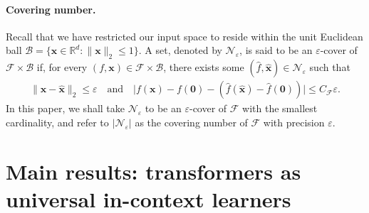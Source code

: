 \documentclass[english]{article}
\begin{document}



\paragraph{Covering number.} 
%
Recall that we have restricted our input space to reside within the unit Euclidean ball $\mathcal{B} = \{{\bm x}\in\mathbb{R}^d:\|{\bm x}\|_2\le 1\}$. 
A set, denoted by $\mathcal{N}_{\varepsilon}$, is said to be an $\varepsilon$-cover of $\mathcal{F}\times \mathcal{B}$ if, for every $(f, {\bm x}) \in \mathcal{F}\times \mathcal{B}$, 
there exists some $(\widehat{f}, \widehat{{\bm x}}) \in \mathcal{N}_{\varepsilon}$ such that
%
\begin{align}
\|{\bm x} - \widehat{{\bm x}}\|_2 \le \varepsilon
\quad\text{and}\quad
\big|f({\bm x}) - f({\bm 0}) - (\widehat{f}(\widehat{{\bm x}}) - \widehat{f}({\bm 0}))\big| \le C_{\mathcal{F}}\varepsilon.
\label{eq:defn-eps-cover}
\end{align}
%
In this paper, we shall take $\mathcal{N}_{\varepsilon}$ to be an $\varepsilon$-cover of $\mathcal{F}$ with the smallest cardinality, and refer to $|\mathcal{N}_{\varepsilon}|$ as the covering number of $\mathcal{F}$ with precision $\varepsilon$.  





\section{Main results: transformers as universal in-context learners}
\label{sec:reults}
\end{document}
